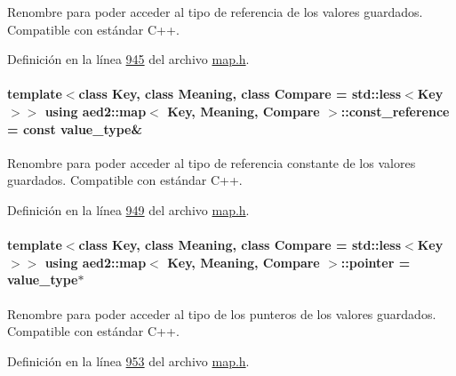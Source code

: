 Renombre para poder acceder al tipo de referencia de los valores guardados. Compatible con estándar C++. 



Definición en la línea \hyperlink{map_8h_source_l00945}{945} del archivo \hyperlink{map_8h_source}{map.\+h}.

\paragraph[{\texorpdfstring{const\+\_\+reference}{const_reference}}]{\setlength{\rightskip}{0pt plus 5cm}template$<$class Key, class Meaning, class Compare = std\+::less$<$\+Key$>$$>$ using {\bf aed2\+::map}$<$ Key, Meaning, Compare $>$\+::{\bf const\+\_\+reference} =  const {\bf value\+\_\+type}\&}\hypertarget{classaed2_1_1map_a277080d3db76f19df9319ecba16475a9_a277080d3db76f19df9319ecba16475a9}{}\label{classaed2_1_1map_a277080d3db76f19df9319ecba16475a9_a277080d3db76f19df9319ecba16475a9}


Renombre para poder acceder al tipo de referencia constante de los valores guardados. Compatible con estándar C++. 



Definición en la línea \hyperlink{map_8h_source_l00949}{949} del archivo \hyperlink{map_8h_source}{map.\+h}.

\paragraph[{\texorpdfstring{pointer}{pointer}}]{\setlength{\rightskip}{0pt plus 5cm}template$<$class Key, class Meaning, class Compare = std\+::less$<$\+Key$>$$>$ using {\bf aed2\+::map}$<$ Key, Meaning, Compare $>$\+::{\bf pointer} =  {\bf value\+\_\+type}$\ast$}\hypertarget{classaed2_1_1map_a7394e98a23b86bc008ad73326b273fd5_a7394e98a23b86bc008ad73326b273fd5}{}\label{classaed2_1_1map_a7394e98a23b86bc008ad73326b273fd5_a7394e98a23b86bc008ad73326b273fd5}


Renombre para poder acceder al tipo de los punteros de los valores guardados. Compatible con estándar C++. 



Definición en la línea \hyperlink{map_8h_source_l00953}{953} del archivo \hyperlink{map_8h_source}{map.\+h}.

